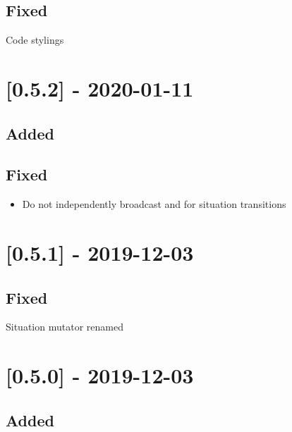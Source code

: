 \subsection{Fixed}

\begin{shortlist}
    \item Code stylings
\end{shortlist}

\section{[0.5.2] - 2020-01-11}

\subsection{Added}

\begin{shortlist}
    \item {}
\end{shortlist}

\subsection{Fixed}

\begin{itemize}
    \item Do not independently broadcast  and  for situation transitions
\end{itemize}

\section{[0.5.1] - 2019-12-03}

\subsection{Fixed}

\begin{shortlist}
    \item Situation mutator renamed 
\end{shortlist}

\section{[0.5.0] - 2019-12-03}

\subsection{Added}

